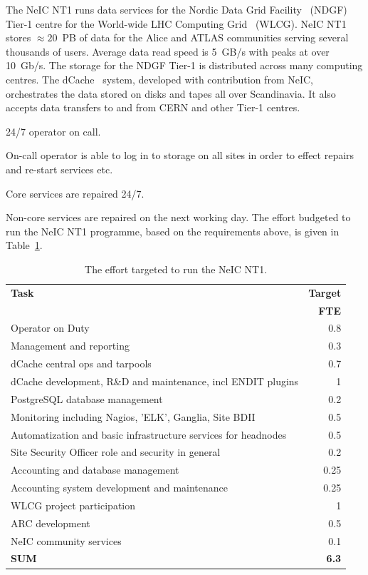 \documentclass[12pt,a4paper]{article}
\newcommand{\nnt}{NeIC NT1\xspace}
\begin{document}
The \nnt runs data services for the Nordic Data Grid Facility~\cite{ndgf}  (NDGF) Tier-1 centre for the World-wide LHC Computing Grid~\cite{wlcg} (WLCG).
\nnt stores $\approx 20$~PB of data for the Alice and ATLAS communities
serving several thousands of users.
Average data read speed is 5~GB/s with peaks at over 10~Gb/s.
The storage for the NDGF Tier-1 is distributed across many computing centres. 
The dCache~\cite{dcache} system, developed with contribution from NeIC, orchestrates the data stored on disks and tapes all over Scandinavia. 
It also accepts data transfers to and from CERN and other Tier-1 centres.
\bitm
\item 24/7 operator on call.
\item On-call operator is able to log in to storage \einfra on all sites in order to effect repairs and re-start services etc.
\item Core services are repaired 24/7.
\item Non-core services are repaired on the next working day.
\eitm
The effort budgeted to run the \nnt programme, based on the requirements above, is given in Table~\ref{tab:nt1}.
\begin{table}[t] \centering
{}
\begin{tabular}{l|r}
{\bf Task} & 	{\bf Target} \\
 & 	{\bf FTE} \\ \hline
Operator on Duty & 0.8 \\
Management and reporting & 0.3 \\
dCache central ops and tarpools	& 0.7 \\
dCache development, R\&D and maintenance, incl ENDIT plugins & 1 \\
PostgreSQL database management & 0.2 \\
Monitoring including Nagios, 'ELK', Ganglia, Site BDII & 0.5 \\
Automatization and basic infrastructure services for headnodes & 0.5 \\
Site Security Officer role and security in general & 0.2 \\
Accounting and database management & 0.25 \\
Accounting system development and maintenance & 0.25 \\
WLCG project participation & 1 \\
ARC development & 0.5 \\
NeIC community services & 0.1 \\ \hline
{\bf SUM} & {\bf 6.3}
\end{tabular}
\caption{The effort targeted to run the \nnt. \label{tab:nt1}}
\end{table}
\end{document}
